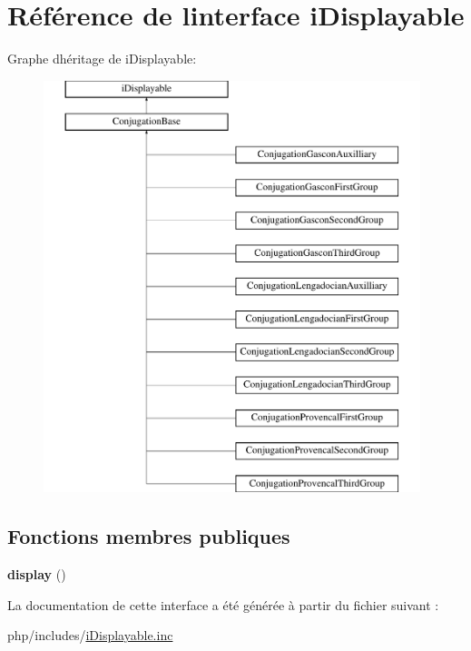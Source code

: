 \hypertarget{interfaceiDisplayable}{}\section{Référence de l\textquotesingle{}interface i\+Displayable}
\label{interfaceiDisplayable}
Graphe d\textquotesingle{}héritage de i\+Displayable\+:\begin{figure}[H]
\begin{center}
\leavevmode
\includegraphics[height=12.000000cm]{interfaceiDisplayable}
\end{center}
\end{figure}
\subsection*{Fonctions membres publiques}
\begin{DoxyCompactItemize}
\item 
\hypertarget{interfaceiDisplayable_a0264fd455c876e897f754cf85f1681ca}{}\label{interfaceiDisplayable_a0264fd455c876e897f754cf85f1681ca} 
{\bfseries display} ()
\end{DoxyCompactItemize}


La documentation de cette interface a été générée à partir du fichier suivant \+:\begin{DoxyCompactItemize}
\item 
php/includes/\hyperlink{iDisplayable_8inc}{i\+Displayable.\+inc}\end{DoxyCompactItemize}
